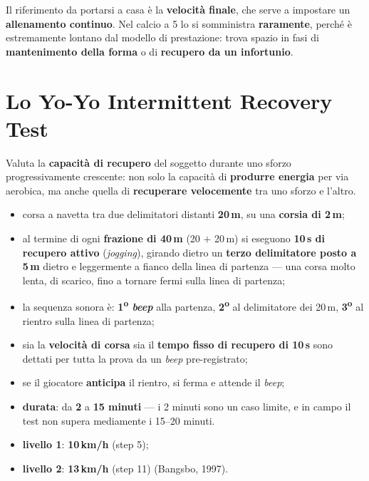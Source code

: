 Il riferimento da portarsi a casa è la \textbf{velocità finale}, che serve a impostare un
\textbf{allenamento continuo}. Nel calcio a 5 lo si somministra \textbf{raramente}, perché è
estremamente lontano dal modello di prestazione: trova spazio in fasi di \textbf{mantenimento della
forma} o di \textbf{recupero da un infortunio}.

\section{Lo Yo-Yo Intermittent Recovery Test}

Valuta la \textbf{capacità di recupero} del soggetto durante uno sforzo progressivamente crescente:
non solo la capacità di \textbf{produrre energia} per via aerobica, ma anche quella di
\textbf{recuperare velocemente} tra uno sforzo e l'altro.

\begin{itemize}
  \item corsa a navetta tra due delimitatori distanti \textbf{20\,m}, su una \textbf{corsia di
    2\,m};
  \item al termine di ogni \textbf{frazione di 40\,m} (20 $+$ 20\,m) si eseguono \textbf{10\,s di
    recupero attivo} (\textit{jogging}), girando dietro un \textbf{terzo delimitatore posto a 5\,m}
    dietro e leggermente a fianco della linea di partenza --- una corsa molto lenta, di scarico,
    fino a tornare fermi sulla linea di partenza;
  \item la sequenza sonora è: \textbf{1\textsuperscript{o} \textit{beep}} alla partenza,
    \textbf{2\textsuperscript{o}} al delimitatore dei 20\,m, \textbf{3\textsuperscript{o}} al
    rientro sulla linea di partenza;
  \item sia la \textbf{velocità di corsa} sia il \textbf{tempo fisso di recupero di 10\,s} sono
    dettati per tutta la prova da un \textit{beep} pre-registrato;
  \item se il giocatore \textbf{anticipa} il rientro, si ferma e attende il \textit{beep};
  \item \textbf{durata}: da \textbf{2} a \textbf{15 minuti} --- i 2 minuti sono un caso limite, e in
    campo il test non supera mediamente i 15--20 minuti.
\end{itemize}

\begin{itemize}
  \item \textbf{livello 1}: \textbf{10\,km/h} (step 5);
  \item \textbf{livello 2}: \textbf{13\,km/h} (step 11) (Bangsbo, 1997).
\end{itemize}

